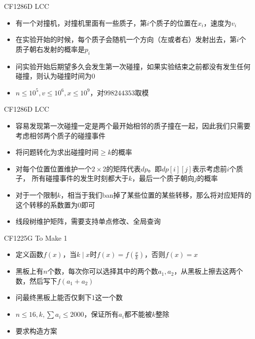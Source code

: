 \documentclass{beamer}
\begin{document}
\begin{frame}{CF1286D LCC}
    \begin{itemize}
        \item 有一个对撞机，对撞机里面有一些质子，第$i$个质子的位置在$x_i$，速度为$v_i$
        \item 在实验开始的时候，每个质子会随机一个方向（左或者右）发射出去，第$i$个质子朝右发射的概率是$p_i$
        \item 问实验开始后期望多久会发生第一次碰撞，如果实验结束之前都没有发生任何碰撞，则认为碰撞时间为$0$
        \item $n \leq 10^5, v \leq 10^6, x \leq 10^9$，对$998244353$取模
    \end{itemize}
\end{frame}

\begin{frame}{CF1286D LCC}
    \begin{itemize}
        \item 容易发现第一次碰撞一定是两个最开始相邻的质子撞在一起，因此我们只需要考虑相邻两个质子的碰撞事件
        \item 将问题转化为求出碰撞时间$\geq k$的概率
        \item 对每个位置位置维护一个$2\times 2$的矩阵代表$dp$。即$dp[i][j]$表示考虑前$i$个质子，
        所有碰撞事件的发生时刻都大于$k$，最后一个质子朝向$j$的概率
        \item 对于一个限制$k$，相当于我们ban掉了某些位置的某些转移，那么将对应矩阵的这个转移的系数置为$0$即可
        \item 线段树维护矩阵，需要支持单点修改、全局查询
    \end{itemize}
\end{frame}

\begin{frame}{CF1225G To Make 1}
    \begin{itemize}
        \item 定义函数$f(x)$，当$k \mid x$时$f(x) = f(\frac xk)$，否则$f(x) = x$
        \item 黑板上有$n$个数，每次你可以选择其中的两个数$a_1, a_2$，从黑板上擦去这两个数，然后写下$f(a_1 + a_2)$
        \item 问最终黑板上能否仅剩下$1$这一个数
        \item $n \leq 16, k, \sum a_i \leq 2000$，保证所有$a_i$都不能被$k$整除
        \item 要求构造方案
    \end{itemize}
\end{frame}
\end{document}
